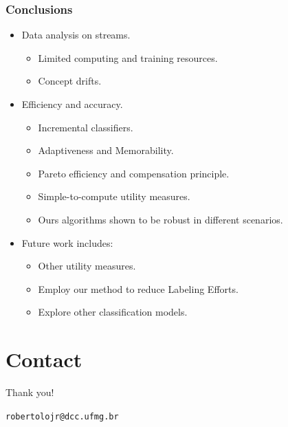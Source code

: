 \documentclass[14pt]{beamer}
\begin{document}
\begin{frame}\frametitle{Conclusions}
\begin{itemize}
\item Data analysis on streams.
\begin{itemize}
\item Limited computing and training resources.
\item Concept drifts.
\end{itemize}
\pause
\item Efficiency and accuracy.
\begin{itemize}
\item Incremental classifiers.
\item Adaptiveness and Memorability.
\item Pareto efficiency and compensation principle.
\item Simple-to-compute utility measures.
\item Ours algorithms shown to be robust in different scenarios.
\end{itemize}
\pause
\item Future work includes:
\begin{itemize}
\item Other utility measures.
\item Employ our method to reduce Labeling Efforts.
\item Explore other classification models.
\end{itemize}
\end{itemize}

\end{frame}

\section{Contact}
\begin{frame}{Thank you!}
\begin{center}
\tt robertolojr@dcc.ufmg.br\\
\end{center}
\end{frame}
\end{document}
